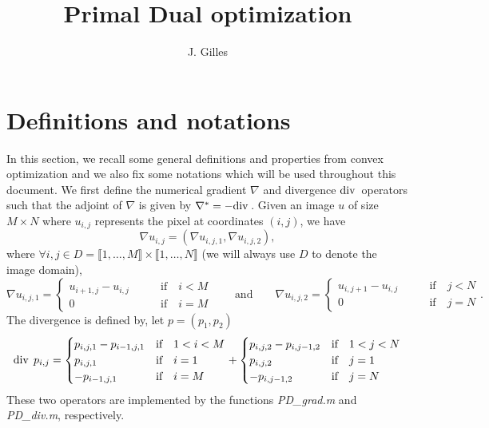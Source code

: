 \documentclass[letter,10pt]{article}
\title{Primal Dual optimization}
\author{J. Gilles}
\def\Div{\textup{div\,}}
\begin{document}
\maketitle

\section{Definitions and notations}
In this section, we recall some general definitions and properties from convex optimization and we also fix some notations which will be used throughout this document.
We first define the numerical gradient $\nabla$ and divergence $\Div$ operators such that the adjoint of $\nabla$ is given by $\nabla^*=-\Div$.
Given an image $u$ of size $M\times N$ where $u_{i,j}$ represents the pixel at coordinates $(i,j)$, we have
$$\nabla u_{i,j}=\left(\nabla u_{i,j,1},\nabla u_{i,j,2} \right),$$
where $\forall i,j \in D=\llbracket 1,\ldots,M \rrbracket \times \llbracket 1,\ldots,N \rrbracket$ (we will always use $D$ to denote the image domain),
\begin{equation}
\nabla u_{i,j,1}=
\begin{cases}
 u_{i+1,j}-u_{i,j} \qquad & \text{if} \quad i<M\\
 0 \qquad & \text{if} \quad i=M
\end{cases}
\quad\quad
\text{and}
\quad\quad
\nabla u_{i,j,2}=
\begin{cases}
 u_{i,j+1}-u_{i,j} \qquad & \text{if} \quad j<N\\
 0 \qquad & \text{if} \quad j=N
\end{cases}.
\end{equation}
The divergence is defined by, let $p=(p_1,p_2)$
\begin{equation}
\Div \; p_{i,j}=
\begin{cases}
p_{i,j,1}-p_{i-1,j,1} & \text{if} \quad 1<i<M\\
p_{i,j,1} & \text{if} \quad i=1\\
-p_{i-1,j,1} & \text{if} \quad i=M\\
\end{cases}
+
\begin{cases}
p_{i,j,2}-p_{i,j-1,2} & \text{if} \quad 1<j<N\\
p_{i,j,2} & \text{if} \quad j=1\\
-p_{i,j-1,2} & \text{if} \quad j=N\\
\end{cases}
\end{equation}
These two operators are implemented by the functions \textit{PD\_grad.m} and \textit{PD\_div.m}, respectively.\\
\end{document}
